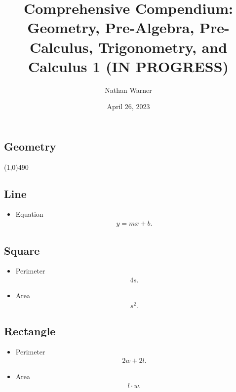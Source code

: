 \documentclass{report}
\title{\Huge{Comprehensive Compendium: Geometry, Pre-Algebra, Pre-Calculus, Trigonometry, and Calculus 1 (IN PROGRESS)}}
\author{\huge{Nathan Warner}}
\date{\huge{April 26, 2023}}
\begin{document}
    \maketitle
    \tableofcontents
    \pagebreak \bigbreak \noindent

    \bigbreak \noindent 
    \begin{center}
      \section{Geometry}
    \end{center}
    \line(1,0){490}
    \bigbreak \noindent \bigbreak \noindent 
    \subsection{Line}
    \begin{itemize}
      \item Equation
        \begin{align*}
          y=mx+b
        .\end{align*}
    \end{itemize}
    \bigbreak \noindent \bigbreak \noindent 
    \subsection{Square}
    \begin{itemize}
      \item Perimeter
        \begin{align*}
          4s
        .\end{align*}
      \item Area
        \begin{align*}
          s^{2}
        .\end{align*}
    \end{itemize}

    \bigbreak \noindent \bigbreak \noindent 
    \subsection{Rectangle}
    \begin{itemize}
      \item Perimeter
        \begin{align*}
          2w + 2l
        .\end{align*}
      \item Area
        \begin{align*}
          l \cdot w
        .\end{align*}
    \end{itemize}
\end{document}
